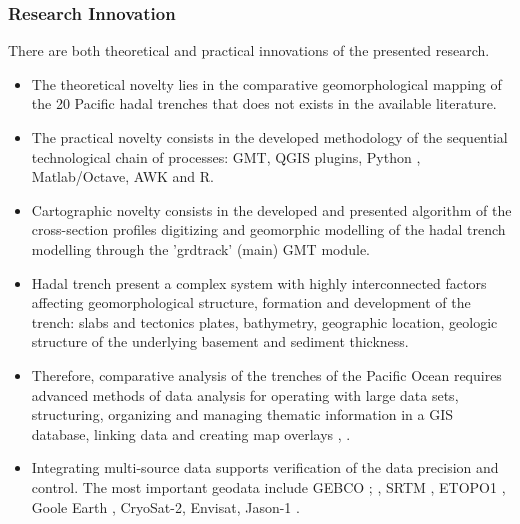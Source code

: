 \documentclass[pdflatex,compress,8pt,
	xcolor={dvipsnames,svgnames,x11names,table},
	hyperref={colorlinks = true,breaklinks = true, urlcolor = NavyBlue}]{beamer}
\begin{document}
\begin{frame}\frametitle{Research Innovation}
There are both theoretical and practical innovations of the presented research. 

\begin{itemize}
            \item The theoretical novelty lies in the comparative geomorphological mapping of the 20 Pacific hadal trenches that does not exists in the available literature. 
            \item The practical novelty consists in the developed methodology of the sequential technological chain of processes: GMT, QGIS plugins, Python \cite{Rossumatal2018}, Matlab/Octave, AWK and R.
            \item Cartographic novelty consists in the developed and presented algorithm of the cross-section profiles digitizing and geomorphic modelling of the  hadal trench modelling through the 'grdtrack' (main) GMT module. 
            \item Hadal trench present a complex system with highly interconnected factors affecting geomorphological structure, formation and development of the trench: slabs and tectonics plates, bathymetry, geographic location, geologic structure of the underlying basement and sediment thickness. 
            \item Therefore, comparative analysis of the trenches of the Pacific Ocean requires advanced methods of data analysis for operating with large data sets, structuring, organizing and managing thematic information in a GIS database, linking data and creating map overlays \cite{Lemenkova201540}, \cite{Lemenkova2016e}. 
            \item Integrating multi-source data supports verification of the data precision and control. The most important geodata include GEBCO \cite{Mayeretal2018}; \cite{Monahan2004}, SRTM \cite{Beckeretal2009}, ETOPO1 \cite{AmanteEakins2009}, Goole Earth \cite{Lemenkova201510}, CryoSat-2, Envisat, Jason-1 \cite{Sandwelletal2013}.
\end{itemize}

\end{frame}
\end{document}
